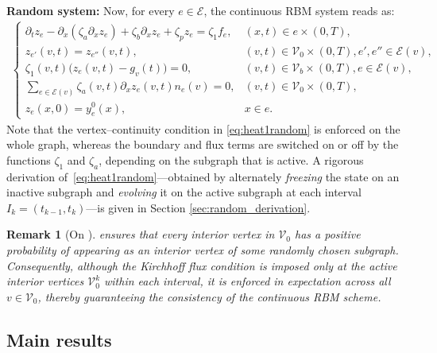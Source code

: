 \documentclass[a4paper, 10pt, english]{article}
\newtheorem{remark}{Remark}[section]
\begin{document}
\noindent
{\bf Random system:} Now, for every $e\in\mathcal{E}$, the continuous RBM system reads as:
\begin{align}\label{eq:heat1random}
\begin{cases}
\partial_t z_e - \partial_x(\zeta_a\partial_x z_e) + \zeta_b\partial_x z_e + \zeta_p z_e = \zeta_1 f_e, & (x,t)\in e\times(0,T), \\
z_{e'}(v,t)=z_{e''}(v,t), & (v,t)\in\mathcal{V}_0\times(0,T), e',e''\in\mathcal{E}(v), \\
\zeta_1(v,t)\bigl(z_e(v,t)-g_v(t)\bigr)=0, & (v,t)\in\mathcal{V}_b\times(0,T),e\in\mathcal{E}(v), \\
\sum_{e\in\mathcal{E}(v)}\zeta_a(v,t)\partial_x z_e(v,t)n_e(v)=0, & (v,t)\in\mathcal{V}_0\times(0,T), \\
z_e(x,0)=y_e^0(x), & x\in e.
\end{cases}
\end{align}
Note that the vertex–continuity condition in \eqref{eq:heat1random} is enforced on the whole graph, whereas the boundary and flux terms are switched on or off by the functions $\zeta_1$ and $\zeta_a$, depending on the subgraph that is active. A rigorous derivation of~\eqref{eq:heat1random}—obtained by alternately \emph{freezing} the state on an inactive subgraph and \emph{evolving} it on the active subgraph at each interval $I_k=(t_{k-1},t_k)$—is given in Section \ref{sec:random_derivation}.

\begin{remark}[On ]
 ensures that every interior vertex in $\mathcal{V}_0$ has a positive probability of appearing as an interior vertex of some randomly chosen subgraph. Consequently, although the Kirchhoff flux condition is imposed only at the active interior vertices $\mathcal V_0^k$ within each interval, it is enforced in expectation across all $v\in\mathcal V_0$, thereby guaranteeing the consistency of the continuous RBM scheme.
\end{remark}

\subsection{Main results}
\end{document}
